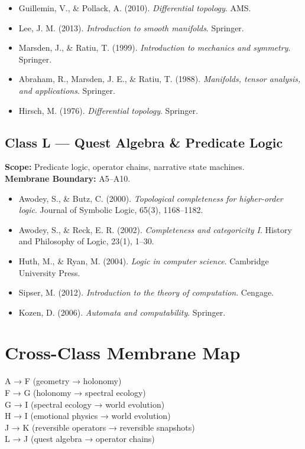 \begin{itemize}
  \item Guillemin, V., \& Pollack, A. (2010). \textit{Differential topology}. AMS.
  \item Lee, J. M. (2013). \textit{Introduction to smooth manifolds}. Springer.
  \item Marsden, J., \& Ratiu, T. (1999). \textit{Introduction to mechanics and symmetry}. Springer.
  \item Abraham, R., Marsden, J. E., \& Ratiu, T. (1988). \textit{Manifolds, tensor analysis, and applications}. Springer.
  \item Hirsch, M. (1976). \textit{Differential topology}. Springer.
\end{itemize}

\subsection*{Class L — Quest Algebra \& Predicate Logic}
\textbf{Scope:} Predicate logic, operator chains, narrative state machines. \\
\textbf{Membrane Boundary:} A5–A10.

\begin{itemize}
  \item Awodey, S., \& Butz, C. (2000). \textit{Topological completeness for higher-order logic}. Journal of Symbolic Logic, 65(3), 1168–1182.
  \item Awodey, S., \& Reck, E. R. (2002). \textit{Completeness and categoricity I}. History and Philosophy of Logic, 23(1), 1–30.
  \item Huth, M., \& Ryan, M. (2004). \textit{Logic in computer science}. Cambridge University Press.
  \item Sipser, M. (2012). \textit{Introduction to the theory of computation}. Cengage.
  \item Kozen, D. (2006). \textit{Automata and computability}. Springer.
\end{itemize}

\section*{Cross-Class Membrane Map}
A → F (geometry → holonomy) \\
F → G (holonomy → spectral ecology) \\
G → I (spectral ecology → world evolution) \\
H → I (emotional physics → world evolution) \\
J → K (reversible operators → reversible snapshots) \\
L → J (quest algebra → operator chains)

